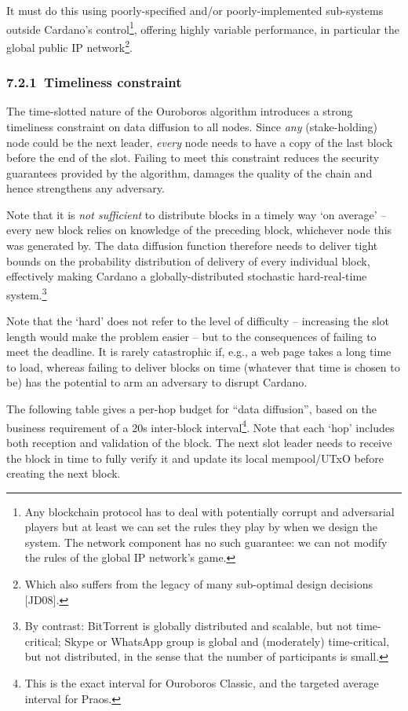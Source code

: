 \documentclass[11pt,a4paper]{article}
\begin{document}
It must do this using poorly-specified and/or poorly-implemented
sub-systems outside Cardano's control\footnote{Any blockchain protocol
  has to deal with potentially corrupt and adversarial players but at
  least we can set the rules they play by when we design the system. The
  network component has no such guarantee: we can not modify the rules
  of the global IP network's game.}, offering highly variable
performance, in particular the global public IP network\footnote{Which
  also suffers from the legacy of many sub-optimal design decisions
  {[}JD08{]}.}.

\hypertarget{timeliness-constraint}{%
\subsubsection{​7.2.1​~Timeliness
constraint}\label{timeliness-constraint}}

The time-slotted nature of the Ouroboros algorithm introduces a strong
timeliness constraint on data diffusion to all nodes. Since \emph{any}
(stake-holding) node could be the next leader, \emph{every} node needs
to have a copy of the last block before the end of the slot. Failing to
meet this constraint reduces the security guarantees provided by the
algorithm, damages the quality of the chain and hence strengthens any
adversary.

Note that it is \emph{not sufficient} to distribute blocks in a timely
way `on average' -- every new block relies on knowledge of the preceding
block, whichever node this was generated by. The data diffusion function
therefore needs to deliver tight bounds on the probability distribution
of delivery of every individual block, effectively making Cardano a
globally-distributed stochastic hard-real-time system.\footnote{By
  contrast: BitTorrent is globally distributed and scalable, but not
  time-critical; Skype or WhatsApp group is global and (moderately)
  time-critical, but not distributed, in the sense that the number of
  participants is small.}

Note that the `hard' does not refer to the level of difficulty --
increasing the slot length would make the problem easier -- but to the
consequences of failing to meet the deadline. It is rarely catastrophic
if, e.g., a web page takes a long time to load, whereas failing to
deliver blocks on time (whatever that time is chosen to be) has the
potential to arm an adversary to disrupt Cardano.

The following table gives a per-hop budget for ``data diffusion'', based
on the business requirement of a 20s inter-block interval\footnote{This
  is the exact interval for Ouroboros Classic, and the targeted average
  interval for Praos.}. Note that each `hop' includes both reception and
validation of the block. The next slot leader needs to receive the block
in time to fully verify it and update its local mempool/UTxO before
creating the next block.
\end{document}
